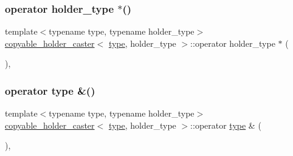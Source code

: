 \subsubsection{\texorpdfstring{operator holder\_type $\ast$()}{operator holder\_type *()}}
{\footnotesize\ttfamily template$<$typename type, typename holder\+\_\+type$>$ \\
\mbox{\hyperlink{structcopyable__holder__caster}{copyable\+\_\+holder\+\_\+caster}}$<$ \mbox{\hyperlink{_s_d_l__opengl_8h_ad5ddf6fca7b585646515660e810e0188}{type}}, holder\+\_\+type $>$\+::operator holder\+\_\+type $\ast$ (\begin{DoxyParamCaption}{ }\end{DoxyParamCaption})\hspace{0.3cm}{\ttfamily [inline]}, {\ttfamily [explicit]}}

\mbox{\label{structcopyable__holder__caster_a80d72d78e526acacc5fc38c63fdc4f69}} 
\subsubsection{\texorpdfstring{operator type \&()}{operator type \&()}}
{\footnotesize\ttfamily template$<$typename type, typename holder\+\_\+type$>$ \\
\mbox{\hyperlink{structcopyable__holder__caster}{copyable\+\_\+holder\+\_\+caster}}$<$ \mbox{\hyperlink{_s_d_l__opengl_8h_ad5ddf6fca7b585646515660e810e0188}{type}}, holder\+\_\+type $>$\+::operator \mbox{\hyperlink{_s_d_l__opengl_8h_ad5ddf6fca7b585646515660e810e0188}{type}} \& (\begin{DoxyParamCaption}{ }\end{DoxyParamCaption})\hspace{0.3cm}{\ttfamily [inline]}, {\ttfamily [explicit]}}

\mbox{\label{structcopyable__holder__caster_a9b3a08950760728cf856a82824b4ddfd}} 
